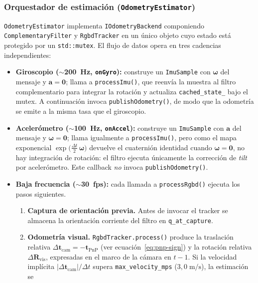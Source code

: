\subsubsection{Orquestador de estimación (\texttt{OdometryEstimator})}

\texttt{OdometryEstimator} implementa \texttt{IOdometryBackend} componiendo
\texttt{ComplementaryFilter} y \texttt{RgbdTracker} en un único objeto cuyo
estado está protegido por un \texttt{std::mutex}. El flujo de datos opera en
tres cadencias independientes:
\begin{itemize}
  \item \textbf{Giroscopio ({$\sim$}200~Hz, \texttt{onGyro}):} construye un
    \texttt{ImuSample} con $\boldsymbol{\omega}$ del mensaje y
    $\mathbf{a}=\mathbf{0}$; llama a \texttt{processImu()}, que reenvía la
    muestra al filtro complementario para integrar la rotación y actualiza
    \texttt{cached\_state\_} bajo el mutex. A continuación invoca
    \texttt{publishOdometry()}, de modo que la odometría se emite a la
    misma tasa que el giroscopio.
  \item \textbf{Acelerómetro ({$\sim$}100~Hz, \texttt{onAccel}):} construye un
    \texttt{ImuSample} con $\mathbf{a}$ del mensaje y
    $\boldsymbol{\omega}=\mathbf{0}$; llama igualmente a
    \texttt{processImu()}, pero como el mapa exponencial
    $\exp\!\bigl(\tfrac{\Delta t}{2}\,\boldsymbol{\omega}\bigr)$ devuelve el
    cuaternión identidad cuando $\boldsymbol{\omega}=\mathbf{0}$, no hay
    integración de rotación: el filtro ejecuta únicamente la corrección de
    \emph{tilt} por acelerómetro. Este callback \emph{no} invoca
    \texttt{publishOdometry()}.
  \item \textbf{Baja frecuencia ({$\sim$}30~fps):} cada llamada a
    \texttt{processRgbd()} ejecuta los pasos siguientes.
    \begin{enumerate}
      \item \textbf{Captura de orientación previa.} Antes de invocar el
        tracker se almacena la orientación corriente del filtro en
        \texttt{q\_at\_capture}.
      \item \textbf{Odometría visual.} \texttt{RgbdTracker.process()} produce
        la traslación relativa $\Delta\mathbf{t}_{\text{cam}} = -\mathbf{t}_{\text{PnP}}$
        (ver ecuación~\ref{eq:pnp-sign}) y la rotación relativa
        $\Delta\mathbf{R}_{\text{vis}}$, expresadas en el marco de la
        cámara en $t-1$. Si la velocidad implícita
        $|\Delta\mathbf{t}_{\text{cam}}| / \Delta t$ supera
        \texttt{max\_velocity\_mps} ($3{,}0\;\text{m/s}$), la estimación se

\end{enumerate}
\end{itemize}

